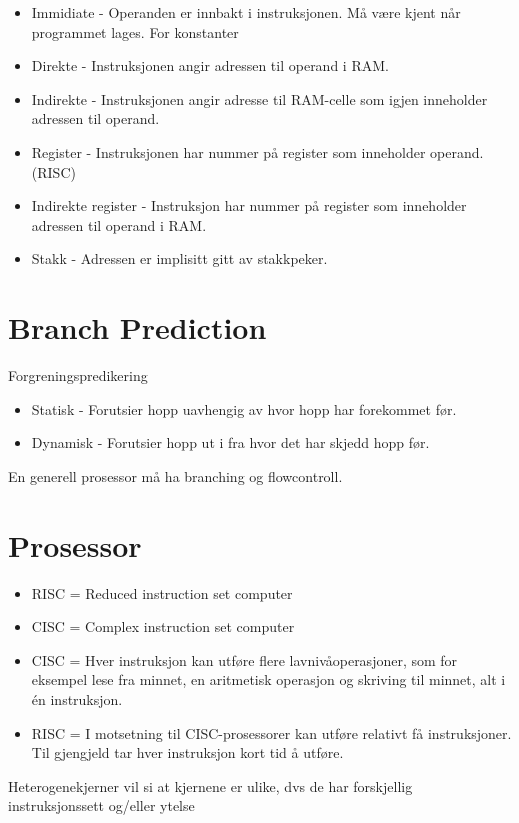 \documentclass[a4paper, 10pt]{article}
\begin{document}
\begin{itemize}
	\item Immidiate - Operanden er innbakt i instruksjonen. Må være kjent når programmet lages. For konstanter
	\item Direkte - Instruksjonen angir adressen til operand i RAM.
	\item Indirekte - Instruksjonen angir adresse til RAM-celle som igjen inneholder adressen til operand.
	\item Register - Instruksjonen har nummer på register som inneholder operand. (RISC)
	\item Indirekte register - Instruksjon har nummer på register som inneholder adressen til operand i RAM.
	\item Stakk - Adressen er implisitt gitt av stakkpeker.
\end{itemize}


\section{Branch Prediction}
Forgreningspredikering

\begin{itemize}
	\item Statisk - Forutsier hopp uavhengig av hvor hopp har forekommet før.
	\item Dynamisk - Forutsier hopp ut i fra hvor det har skjedd hopp før.
\end{itemize}

En generell prosessor må ha branching og flowcontroll.

\section{Prosessor}

\begin{itemize}
\item RISC = Reduced instruction set computer 
\item CISC = Complex instruction set computer
\item CISC = Hver instruksjon kan utføre flere lavnivåoperasjoner, som for eksempel lese fra minnet, en aritmetisk operasjon og skriving til minnet, alt i én instruksjon.
\item RISC = I motsetning til CISC-prosessorer kan utføre relativt få instruksjoner. Til gjengjeld tar hver instruksjon kort tid å utføre.
\end{itemize}

Heterogenekjerner vil si at kjernene er ulike, dvs de har forskjellig instruksjonssett og/eller ytelse
\end{document}
